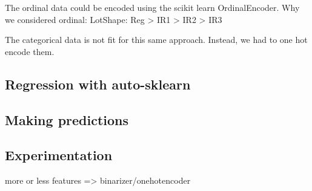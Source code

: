 \documentclass[a4paper, 12pt, twoside]{report}
\begin{document}
The ordinal data could be encoded using the scikit learn OrdinalEncoder.
Why we considered ordinal:
LotShape: Reg > IR1 > IR2 > IR3

The categorical data is not fit for this same approach. Instead, we had to one hot encode them.

\subsection{Regression with auto-sklearn}

\subsection{Making predictions}

\subsection{Experimentation}
more or less features => binarizer/onehotencoder
\end{document}
